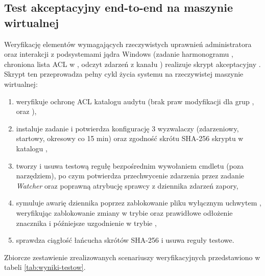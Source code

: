 \subsection{Test akceptacyjny end-to-end na maszynie wirtualnej}\label{subsec:testy-akceptacyjne}

Weryfikację elementów wymagających rzeczywistych uprawnień administratora oraz interakcji z podsystemami jądra Windows (zadanie harmonogramu , chroniona lista ACL w , odczyt zdarzeń z kanału ) realizuje skrypt akceptacyjny . Skrypt ten przeprowadza pełny cykl życia systemu na rzeczywistej maszynie wirtualnej:
\begin{enumerate}
    \item weryfikuje ochronę ACL katalogu audytu (brak praw modyfikacji dla grup ,  oraz ),
    \item instaluje zadanie \code{\FirewallAudit\Watcher} i potwierdza konfigurację 3 wyzwalaczy (zdarzeniowy, startowy, okresowy co 15 min) oraz zgodność skrótu SHA-256 skryptu w katalogu ,
    \item tworzy i usuwa testową regułę  bezpośrednim wywołaniem cmdletu  (poza narzędziem), po czym potwierdza przechwycenie zdarzenia przez zadanie \textit{Watcher} oraz poprawną atrybucję sprawcy z dziennika zdarzeń zapory,
    \item symuluje awarię dziennika poprzez zablokowanie pliku  wyłącznym uchwytem , weryfikując zablokowanie zmiany w trybie  oraz prawidłowe odłożenie znacznika i późniejsze uzgodnienie w trybie ,
    \item sprawdza ciągłość łańcucha skrótów SHA-256 i usuwa reguły testowe.
\end{enumerate}

Zbiorcze zestawienie zrealizowanych scenariuszy weryfikacyjnych przedstawiono w tabeli \ref{tab:wyniki-testow}.

